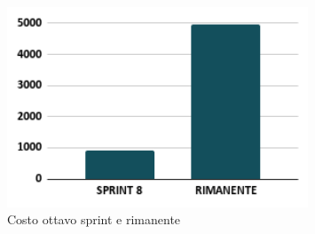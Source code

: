 \begin{figure}[h!]
    \centering
    \includegraphics[width=0.8\textwidth]{cons8costo.png}
    \caption{Costo ottavo sprint e rimanente}
    \label{fig:consuntivocostoottavosprint}
\end{figure}

\newpage
